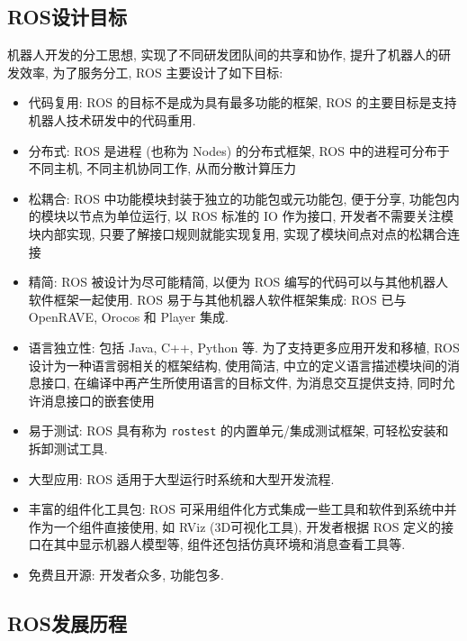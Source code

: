 \documentclass[openany, fontset=windowsold]{ctexbook}
\theoremstyle{kaiti}
\theoremstyle{normal}
\begin{document}
\subsection{ROS设计目标}

机器人开发的分工思想, 实现了不同研发团队间的共享和协作, 提升了机器人的研发效率, 为了服务分工, ROS 主要设计了如下目标: 

\begin{itemize}
  \item 代码复用: ROS 的目标不是成为具有最多功能的框架, ROS 的主要目标是支持机器人技术研发中的代码重用.

  \item 分布式: ROS 是进程 (也称为 Nodes) 的分布式框架, ROS 中的进程可分布于不同主机, 不同主机协同工作, 从而分散计算压力

  \item 松耦合: ROS 中功能模块封装于独立的功能包或元功能包, 便于分享, 功能包内的模块以节点为单位运行, 以 ROS 标准的 IO 作为接口, 开发者不需要关注模块内部实现, 只要了解接口规则就能实现复用, 实现了模块间点对点的松耦合连接

  \item 精简: ROS 被设计为尽可能精简, 以便为 ROS 编写的代码可以与其他机器人软件框架一起使用. ROS 易于与其他机器人软件框架集成: ROS 已与 OpenRAVE, Orocos 和 Player 集成.

  \item 语言独立性: 包括 Java, C++, Python 等. 为了支持更多应用开发和移植, ROS 设计为一种语言弱相关的框架结构, 使用简洁, 中立的定义语言描述模块间的消息接口, 在编译中再产生所使用语言的目标文件, 为消息交互提供支持, 同时允许消息接口的嵌套使用

  \item 易于测试: ROS 具有称为 \verb|rostest| 的内置单元/集成测试框架, 可轻松安装和拆卸测试工具.

  \item 大型应用: ROS 适用于大型运行时系统和大型开发流程.

  \item 丰富的组件化工具包: ROS 可采用组件化方式集成一些工具和软件到系统中并作为一个组件直接使用, 如 RViz (3D可视化工具), 开发者根据 ROS 定义的接口在其中显示机器人模型等, 组件还包括仿真环境和消息查看工具等.

  \item 免费且开源: 开发者众多, 功能包多.
\end{itemize}

\subsection{ROS发展历程}
\end{document}

